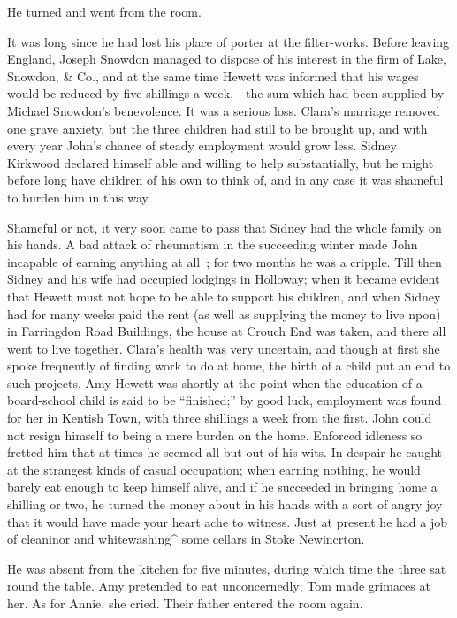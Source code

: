 He turned and went from the room.

It was long since he had lost his place of porter at the filter-works.
Before leaving England, Joseph Snowdon managed to dispose of his
interest in the firm of Lake, Snowdon, \& Co., and at the same time
Hewett was informed that his wages would be reduced by five shillings a
week,---the sum which had been supplied by Michael Snowdon's
benevolence. It was a serious loss. Clara's marriage removed one grave
anxiety, but the three children had still to be brought up, and with
every year John's chance of steady employment would grow less. Sidney
Kirkwood declared himself able and willing to help substantially, but he
might before long have children of his own to think of, and in any case
it was shameful to burden him in this way.

Shameful or not, it very soon came to pass that Sidney had the whole
family on his hands. {\protect\hypertarget{258}{}{}} A bad attack of
rheumatism in the succeeding winter made John incapable of earning
anything at all~; for two months he was a cripple. Till then Sidney and
his wife had occupied lodgings in Holloway; when it became evident that
Hewett must not hope to be able to support his children, and when Sidney
had for many weeks paid the rent (as well as supplying the money to live
npon) in Farringdon Road Buildings, the house at Crouch End was taken,
and there all went to live together. Clara's health was very uncertain,
and though at first she spoke frequently of finding work to do at home,
the birth of a child put an end to such projects. Amy Hewett was shortly
at the point when the education of a board-school child is said to be
``finished;'' by good luck, employment was found for her in Kentish
Town, with three shillings a week from the first. John could not resign
himself to being a mere burden on the home. Enforced idleness so fretted
him that at times he seemed all but out of his wits. In despair he
caught at the strangest kinds of casual occupation; when earning
nothing, he would barely eat enough to keep himself alive, and if he
succeeded in bringing {\protect\hypertarget{259}{}{}} home a shilling or
two, he turned the money about in his hands with a sort of angry joy
that it would have made your heart ache to witness. Just at present he
had a job of cleaninor and whitewashing\^{} some cellars in Stoke
Newincrton.

He was absent from the kitchen for five minutes, during which time the
three sat round the table. Amy pretended to eat unconcernedly; Tom made
grimaces at her. As for Annie, she cried. Their father entered the room
again.

